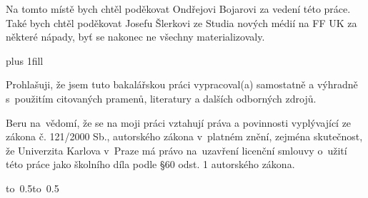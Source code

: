 \documentclass[12pt,a4paper]{report}
\let\openright=\clearpage
\begin{document}
\newpage



\openright

\noindent
Na tomto místě bych chtěl poděkovat Ondřejovi Bojarovi za vedení této práce. Také bych chtěl poděkovat Josefu Šlerkovi ze Studia nových médií na FF UK za některé nápady, byť se nakonec ne všechny materializovaly.

\newpage

\vglue 0pt plus 1fill

\noindent
Prohlašuji, že jsem tuto bakalářskou práci vypracoval(a) samostatně a výhradně
s~použitím citovaných pramenů, literatury a dalších odborných zdrojů.

\medskip\noindent
Beru na~vědomí, že se na moji práci vztahují práva a povinnosti vyplývající
ze zákona č. 121/2000 Sb., autorského zákona v~platném znění, zejména skutečnost,
že Univerzita Karlova v~Praze má právo na~uzavření licenční smlouvy o~užití této
práce jako školního díla podle §60 odst. 1 autorského zákona.

\vspace{10mm}

\hbox{\hbox to 0.5\hbox to 0.5}


\vspace{20mm}
\newpage
\end{document}
